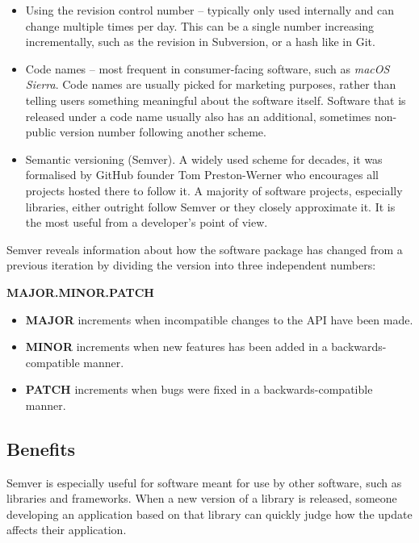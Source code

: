 \documentclass{l4proj}
\begin{document}
\begin{itemize}
\item Using the revision control number -- typically only used
internally and can change multiple times per day. This can be a single
number increasing incrementally, such as the revision in Subversion,
or a hash like in Git.
\item Code names -- most frequent in consumer-facing software, such as
\textit{macOS Sierra}. Code names are usually picked for marketing
purposes, rather than telling users something meaningful about the
software itself. Software that is released under a code name usually
also has an additional, sometimes non-public version number following
another scheme.
\item Semantic versioning (Semver)\cite{SemanticVersioning}. A widely
used scheme for decades, it was formalised by GitHub founder Tom
Preston-Werner who encourages all projects hosted there to follow it.
A majority of software projects, especially libraries, either outright
follow Semver or they closely approximate it. It is the most useful
from a developer's point of view.
\end{itemize}

Semver reveals information about how the software package has changed
from a previous iteration by dividing the version into three
independent numbers:
\begin{center}
\textbf{MAJOR.MINOR.PATCH}
\end{center}

\begin{itemize}
\item \textbf{MAJOR} increments when incompatible changes to the API
have been made.
\item \textbf{MINOR} increments when new features has been added in a
backwards-compatible manner.
\item \textbf{PATCH} increments when bugs were fixed in a
backwards-compatible manner.
\end{itemize}

\subsection{Benefits}

Semver is especially useful for software meant for use by other
software, such as libraries and frameworks. When a new version of a
library is released, someone developing an application based on that
library can quickly judge how the update affects their application.
\end{document}
